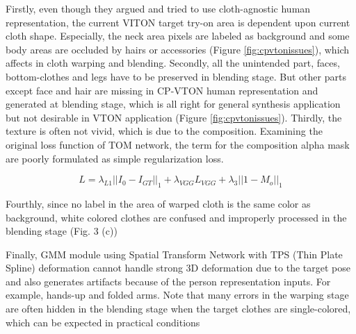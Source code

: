 Firstly, even though they argued and tried to use cloth-agnostic human representation, the current VITON target try-on area is dependent upon current cloth shape. Especially, the neck area pixels are labeled as background and some body areas are occluded by hairs or accessories (Figure \ref{fig:cpvtonissues}), which affects in cloth warping and blending. 
Secondly, all the unintended part, faces, bottom-clothes and legs have to be preserved in blending stage. But other parts except face and hair are missing in CP-VTON\cite{Wang2018TowardCI} human representation and generated at blending stage, which is all right for general synthesis application but not desirable in VTON application (Figure \ref{fig:cpvtonissues}). 
Thirdly, the texture is often not vivid, which is due to the composition. Examining the original loss function of TOM network, the term for the composition alpha mask are poorly formulated as simple regularization loss.   

\begin{equation}
L = \lambda_{L1} || I_0-I_{GT} ||_1 +  \lambda_{VGG} L_{VGG}+ \lambda_3 || 1 - M_{o} ||_1        
\end{equation} 

Fourthly, since no label in the area of warped cloth is the same color as background, white colored clothes are confused and improperly processed in the blending stage (Fig. 3 (c))


Finally, GMM module using Spatial Transform Network\cite{JaderbergSZK15} with TPS (Thin Plate Spline)\cite{Bookstein1989PrincipalWT} deformation cannot handle strong 3D deformation due to the target pose and also generates artifacts because of the person representation inputs. For example, hands-up and folded arms.  Note that many errors in the warping stage are often hidden in the blending stage when the target clothes are single-colored, which can be expected in practical conditions 



